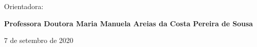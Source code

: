 \vspace{0,5cm}
\begin{center}
\begin{normalsize}
\begin{large}
Orientadora:
\end{large}
\end{normalsize}
\end{center}

\vspace{0.2cm}
\begin{center}
\begin{large}
\textbf{Professora Doutora Maria Manuela Areias da Costa Pereira de Sousa}
\end{large}
\end{center}



\vspace{0.5cm}
\begin{center}
\begin{normalsize}
7 de setembro de 2020
\end{normalsize}
\end{center}
